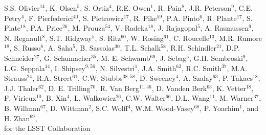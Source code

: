 {S.S. Olivier$^{14}$,
K. Olsen$^5$, 
S. Ortiz$^4$, 
R.E. Owen$^1$,
R. Pain$^{8}$,
J.R. Peterson$^{9}$,
C.E. Petry$^{4}$,  
F. Pierfederici$^{40}$,
S. Pietrowicz$^{17}$,
R. Pike$^{59}$,
P.A. Pinto$^{6}$,   
R. Plante$^{17}$,
S. Plate$^{18}$, 
P.A. Price$^{26}$,
M. Prouza$^{54}$,
V. Radeka$^{18}$, 
J. Rajagopal$^5$,   
A. Rasmussen$^9$,
N. Regnault$^8$,  
S.T. Ridgway$^5$, 
S. Ritz$^{60}$, 
W. Rosing$^{61}$,
C. Roucelle$^{13}$, 
M.R. Rumore$^{18}$, 
S. Russo$^8$,  
A. Saha$^{5}$,     
B. Sassolas$^{30}$, 
T.L. Schalk$^{58}$,     
R.H. Schindler$^{21}$,
D.P. Schneider$^{27}$,    
G. Schumacher$^{35}$,
M. E. Schwamb$^{69}$,
J. Sebag$^5$,
G.H. Sembroski$^9$, 
L.G. Seppala$^{14}$,
I. Shipsey$^{9,56}$,
N. Silvestri$^1$,
J.A. Smith$^{62}$,    
R.C. Smith$^{37}$,
M.A. Strauss$^{24}$,     
R.A. Street$^{61}$,     
C.W. Stubbs$^{38,58}$,
D. Sweeney$^4$,
A. Szalay$^{63}$,
P. Takacs$^{18}$, 
J.J. Thaler$^{62}$,
D. E. Trilling$^{70}$,
R. Van Berg$^{11,46}$, 
D. Vanden Berk$^{63}$,  
K. Vetter$^{18}$, 
F. Virieux$^{10}$, 
B. Xin$^4$,
L. Walkowicz$^{26}$,
C.W. Walter$^{66}$, 
D.L. Wang$^{11}$,
M. Warner$^{37}$,
B. Willman$^{67}$,
D. Wittman$^2$,
S.C. Wolff$^4$, 
W.M. Wood-Vasey$^{68}$,  
P. Yoachim$^1$,
and H. Zhan$^{69}$, \\
for the LSST Collaboration
}
\affil{}

